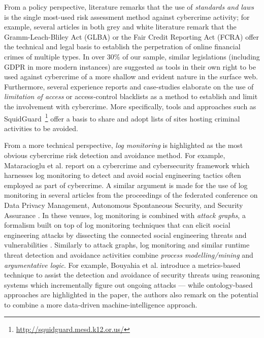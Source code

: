 From a policy perspective, literature remarks that the use of \emph{standards and laws} is the single most-used risk assessment method against cybercrime activity; for example, several articles in both grey and white literature remark that the Gramm-Leach-Bliley Act (GLBA) \cite{Chen2004c} or the Fair Credit Reporting Act (FCRA) \cite{Hoofnagle2013} offer the technical and legal basis to establish the perpetration of online financial crimes of multiple types. In over 30\% of our sample, similar legislations (including GDPR in more modern instances) are suggested as tools in their own right to be used against cybercrime of a more shallow and evident nature in the surface web. Furthermore, several experience reports and case-studies elaborate on the use of \emph{limitation of access} or access-control blacklists as a method to establish and limit the involvement with cybercrime. More specifically, tools and approaches such as SquidGuard~\footnote{\url{http://squidguard.mesd.k12.or.us/}} offer a basis to share and adopt lists of sites hosting criminal activities to be avoided. 

From a more technical perspective, \emph{log monitoring} is highlighted as the most obvious cybercrime risk detection and avoidance method. For example, Mataracioglu et al. \cite{MataraciogluOH15} report on a cybercrime and cybersecurity framework which harnesses log monitoring to detect and avoid social engineering tactics often employed as part of cybercrime. A similar argument is made for the use of log monitoring in several articles from the proceedings of the federated conference on Data Privacy Management, Autonomous Spontaneous Security, and Security Assurance \cite{2014-8872}. In  these venues, log monitoring is combined with \emph{attack graphs}, a formalism built on top of log monitoring techniques that can elicit social engineering attacks by dissecting the connected social engineering threats and vulnerabilities \cite{BeckersKY14}. Similarly to attack graphs, log monitoring and similar runtime threat detection and avoidance activities combine \emph{process modelling/mining} and \emph{argumentative logic}. For example, Bouyahia et al. \cite{BouyahiaICCA14} introduce a metrics-based technique to assist the detection and avoidance of security threats using reasoning systems which incrementally figure out ongoing attacks --- while ontology-based approaches are highlighted in the paper, the authors also remark on the potential to combine a more data-driven machine-intelligence approach. 



